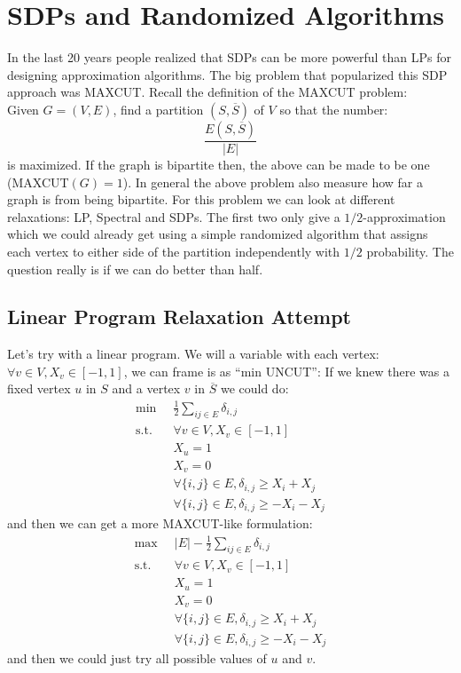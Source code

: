\documentclass[11pt]{article}
\begin{document}

\section*{SDPs and Randomized Algorithms}
In the last 20 years people realized that SDPs can be more powerful than LPs for designing approximation algorithms. The big problem that popularized this SDP approach was MAXCUT. Recall the definition of the MAXCUT problem:\\

\noindent
Given $G= (V,E)$, find a partition $(S,\overline{S})$ of $V$ so that the number:
\[
    \frac{E(S, \overline{S})}{|E|}
\]
is maximized. If the graph is bipartite then, the above can be made to be one (MAXCUT$(G) = 1$). In general the above problem also measure how far a graph is from being bipartite. For this problem we can look at different relaxations: LP, Spectral and SDPs. The first two only give a $1/2$-approximation which we could already get using a simple randomized algorithm that assigns each vertex to either side of the partition independently with $1/2$ probability. The question really is if we can do better than half. 

\subsection*{Linear Program Relaxation Attempt}
Let's try with a linear program. We will a variable with each vertex: $\forall v \in V, X_v \in [-1,1]$, we can frame is as ``min UNCUT'':
If we knew there was a fixed vertex $u$ in $S$ and a vertex $v$ in $\overline{S}$ we could do:
\begin{align*}
    \min \;&\; \frac{1}{2} \sum_{ij\in E} \delta_{i,j}\\
    \text{s.t.}\; &\;\forall v \in V, X_v \in [-1,1]\\
    &\; X_u =1\\
    &\; X_v =0\\
    &\; \forall \{i,j
    \}\in E, \delta_{i,j} \geq X_i + X_j\\
    &\; \forall \{i,j
    \}\in E, \delta_{i,j} \geq -X_i - X_j
\end{align*}
and then we can get a more MAXCUT-like formulation:
\begin{align*}
    \max \;&\; |E| - \frac{1}{2} \sum_{ij\in E} \delta_{i,j}\\
    \text{s.t.}\; &\;\forall v \in V, X_v \in [-1,1]\\
    &\; X_u =1\\
    &\; X_v =0\\
    &\; \forall \{i,j
    \}\in E, \delta_{i,j} \geq X_i + X_j\\
    &\; \forall \{i,j
    \}\in E, \delta_{i,j} \geq -X_i - X_j
\end{align*}
and then we could just try all possible values of $u$ and $v$.
\end{document}
